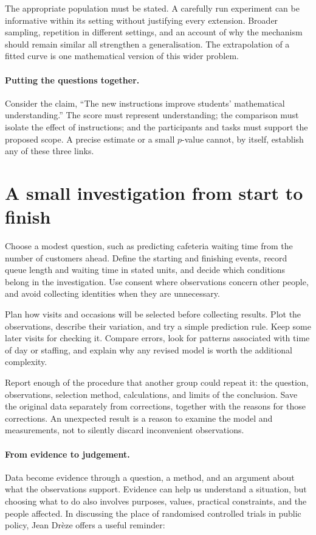 The appropriate population must be stated. A carefully run experiment can
be informative within its setting without justifying every extension.
Broader sampling, repetition in different settings, and an account of why
the mechanism should remain similar all strengthen a generalisation.
The extrapolation of a fitted curve is one mathematical version of this
wider problem.

\paragraph{Putting the questions together.}
Consider the claim, ``The new instructions improve students' mathematical
understanding.'' The score must represent understanding; the comparison
must isolate the effect of instructions; and the participants and tasks
must support the proposed scope. A precise estimate or a small $p$-value
cannot, by itself, establish any of these three links.

\section{A small investigation from start to finish}
\label{sec:ds-investigation}
Choose a modest question, such as predicting cafeteria waiting time from
the number of customers ahead. Define the starting and finishing events,
record queue length and waiting time in stated units, and decide which
conditions belong in the investigation. Use consent where observations concern other people,
and avoid collecting identities when they are unnecessary.

Plan how visits and occasions will be selected before collecting results.
Plot the observations, describe their variation, and try a simple prediction
rule. Keep some later visits for checking it. Compare errors, look for
patterns associated with time of day or staffing, and explain why any
revised model is worth the additional complexity.

Report enough of the procedure that another group could repeat it: the
question, observations, selection method, calculations, and limits of the
conclusion. Save the original data separately from corrections, together
with the reasons for those corrections. An unexpected result is a reason
to examine the model and measurements, not to silently discard inconvenient
observations.

\paragraph{From evidence to judgement.}
Data become evidence through a question, a method, and an argument about
what the observations support. Evidence can help us understand a situation,
but choosing what to do also involves purposes, values, practical constraints,
and the people affected. In discussing the place of randomised controlled
trials in public policy, Jean Dr\`eze offers a useful reminder:

